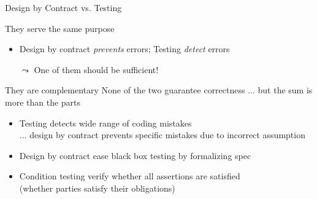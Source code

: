 \begin{frame}{Design by Contract vs. Testing}
  \begin{block}{They serve the same purpose}
    \begin{itemize}
    \item Design by contract \textit{prevents} errors; Testing \textit{detect}
      errors
    \item[$\leadsto$] One of them should be sufficient!
    \end{itemize}
  \end{block}

  \begin{block}{They are complementary}\medskip
    None of the two guarantee correctness ... but the sum is more than the
    parts
    \begin{itemize}
    \item Testing detects wide range of coding mistakes\\
      ... design by contract prevents specific mistakes due to incorrect
      assumption
    \item Design by contract ease black box testing by formalizing
      spec 
    \item Condition testing verify whether all assertions are satisfied\\
      {\small(whether parties satisfy their obligations)}
    \end{itemize}
  \end{block}
\end{frame}
